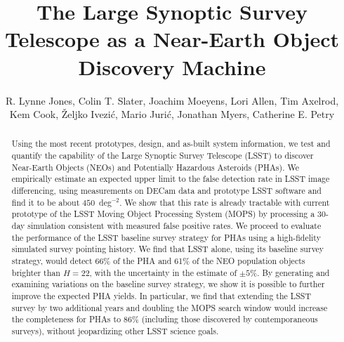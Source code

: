 \documentclass[12pt,preprint]{aastex}
\begin{document}
\title{The Large Synoptic Survey Telescope as a Near-Earth Object Discovery Machine}

\author{R. Lynne Jones,
Colin T. Slater,
Joachim Moeyens,
Lori Allen,
Tim Axelrod,
Kem Cook,
\v{Z}eljko Ivezi\'{c},
Mario Juri\'{c},
Jonathan Myers,
Catherine E. Petry
}

\begin{abstract}
Using the most recent prototypes, design, and as-built system information, we test and quantify the capability of the Large Synoptic Survey Telescope (LSST) to discover Near-Earth Objects (NEOs) and Potentially Hazardous Asteroids (PHAs).
We empirically estimate an expected upper limit to the false detection rate in LSST image differencing, using measurements on DECam data and prototype LSST software and find it to be about $450$~deg$^{-2}$. We show that this rate is already tractable with current prototype of the LSST Moving Object Processing System (MOPS) by processing a 30-day simulation consistent with measured false positive rates.
We proceed to evaluate the performance of the LSST baseline survey strategy for  PHAs using a high-fidelity simulated survey pointing history. 
We find that LSST alone, using its baseline survey strategy, would detect 66\% of the PHA and 61\% of the NEO population objects brighter than $H=22$, with the uncertainty in the estimate of $\pm5$\%. By generating and examining variations on the baseline survey strategy, we show it is possible to further improve the expected PHA yields.
In particular, we find that extending the LSST survey by two additional years and doubling the MOPS search window would increase the completeness for PHAs to 86\% (including those discovered by contemporaneous surveys), without jeopardizing other LSST science goals.
\end{abstract}
\end{document}
